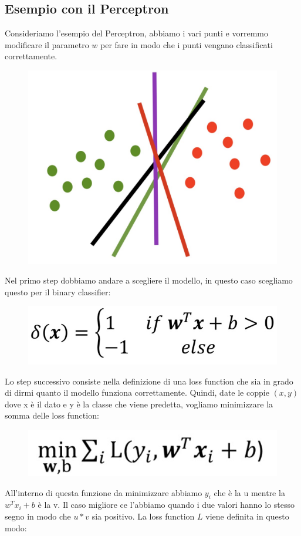 \documentclass[14pt]{extreport}
\begin{document}
\subsection{Esempio con il Perceptron}

Consideriamo l'esempio del Perceptron, abbiamo i vari punti e vorremmo modificare il parametro $w$ per fare in modo che i punti vengano classificati
correttamente.

\begin{figure}[H]
\centering
\includegraphics[width=0.5\linewidth]{265.jpeg}
\end{figure}

Nel primo step dobbiamo andare a scegliere il modello, in questo caso scegliamo questo per il binary classifier:

\begin{figure}[H]
\centering
\includegraphics[width=0.5\linewidth]{264.jpeg}
\end{figure}


Lo step successivo consiste nella definizione di una loss function che sia in grado di dirmi quanto il modello funziona correttamente. Quindi, date le
coppie $(x,y)$ dove x è il dato e y è la classe che viene predetta, vogliamo minimizzare la somma delle loss function:
\begin{figure}[H]
\centering
\includegraphics[width=0.5\linewidth]{266.jpeg}
\end{figure}

All'interno di questa funzione da minimizzare abbiamo $y_i$ che è la u mentre la $w^Tx_i + b$ è la v. Il caso migliore ce l'abbiamo quando i due
valori hanno lo stesso segno in modo che $u*v$ sia positivo. La loss function $L$ viene definita in questo modo:
\end{document}
